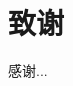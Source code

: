 \chapter[致谢]{致\quad 谢}%
感谢...
\begin{comment}
首先感谢我的指导老师——崔晓玲研究员，感谢崔老师在整个研究期间对我的指导、鼓励和教诲。在做学问、做人、做事各个方面崔老师对我都影响深远。在我刚开始科研的前期，我对于物理的理解浮于表面，对科研浅尝辄止，遇到困难容易产生放弃的心理。崔老师并没有因此而放弃我，而是对我的错误和迷茫给予宽容和开导，辅之以始终如一的一次次耐心的学术讨论，让我一步一步走到今天，来完成我的博士论文。在科研方面，她清晰的物理图像、缜密的逻辑思维、对物理的深刻理解使我受益匪浅，每次在遇到棘手问题不知如何下手的时候，与崔老师的讨论都会及时地使我理清思路，找到切入的方向，一种豁然开朗的感觉如拨云见日。在一次一次的组会讨论中，她对于前沿课题的把握、领域内重要问题的嗅觉指引着我们探索物理的方向，她鼓励我们去问问题，想问题，思考背后的动机，这塑造了我的科研方式。在崔老师身上，我努力去学习新一代年轻物理学家如何做科研，如何做好的科研。在做人做事方面，崔老师脚踏实地，严格要求，毫不拖延的执行力是我要践行去学习的。她对于物理研究的专注与热情时刻激励着我。

感谢清华大学高等研究院的翟荟教授，学习翟老师的冷原子课程与冷原子物理讲义是我理解冷原子物理的基础。翟老师线上线下的科研报告与访谈树立着研究的典范，对于科研品味的追求更是令人心驰神往。感谢武汉物理数学研究所的管习文研究员，与管老师关于极化子到分子转变中分数统计的讨厘清了我的疑惑，管老师的报告以及个人研究经历的分享使我受益良多，从澳大利亚“背”回问题的精神值得我努力学习。 感谢中国科学技术大学的易为教授，短暂地几次与易为老师关于非厄米物理的交流开阔了我的研究视野，易为老师的鼓励激励着我前行。

感谢麻银峰师兄和刘瑞金师兄，我们的合作使我受益良多，遇到难点我们互相讨论解答，互相启发。感谢周黎红师姐、江慧师姐、潘磊师兄、王健师兄、梁辰光师兄、给予我的帮助与指导，不断解答我的疑惑。感谢张越水、张帅、刘春晖、张华琛等同学，与你们的讨论与交流使我了解到更多领域的研究。

感谢齐建为老师，感谢您的教导与辛勤工作，为我们的学习、生活提供了很多便利条件。感谢管理部门各位老师的辛勤付出。

感谢彭雪琦同学一路走在来的鼓励和陪伴，希望我们会有一个美好的未来！

最后感谢我的父母家人，感谢他们给予我的理解与支持，感谢他们的关心与照顾，



\end{comment}

